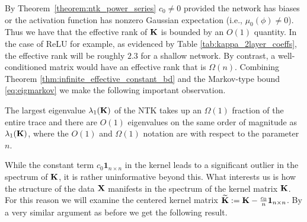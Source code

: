 By Theorem~\ref{theorem:ntk_power_series} $c_0 \neq 0$ provided the network has biases or the activation function has nonzero Gaussian expectation (i.e., $\mu_0(\phi) \neq 0$).  Thus we have that the effective rank of $\mathbf{K}$ is bounded by an $O(1)$ quantity. In the case of ReLU for example, as evidenced by Table \ref{tab:kappa_2layer_coeffs}, the effective rank will be roughly $2.3$ for a shallow network.  By contrast, a well-conditioned matrix would have an effective rank that is $\Omega(n)$.  Combining Theorem \ref{thm:infinite_effective_constant_bd} and the Markov-type bound \eqref{eq:eigmarkov} we make the following important observation. 
\begin{observation}\label{obs:order_one_outliers}
The largest eigenvalue $\lambda_1(\mathbf{K})$ of the NTK takes up an $\Omega(1)$ fraction of the entire trace and there are $O(1)$ eigenvalues on the same order of magnitude as $\lambda_1(\mathbf{K})$, where the $O(1)$ and $\Omega(1)$ notation are with respect to the parameter $n$.
\end{observation}
While the constant term $c_0 \mathbf{1}_{n \times n}$ in the kernel leads to a significant outlier in the spectrum of $\mathbf{K}$, it is rather uninformative beyond this.  What interests us is how the structure of the data $\mathbf{X}$ manifests in the spectrum of the kernel matrix $\mathbf{K}$.  For this reason we will examine the centered kernel matrix $\widetilde{\mathbf{K}} := \mathbf{K} - \frac{c_0}{n} \mathbf{1}_{n \times n}$.  By a very similar argument as before we get the following result. 

